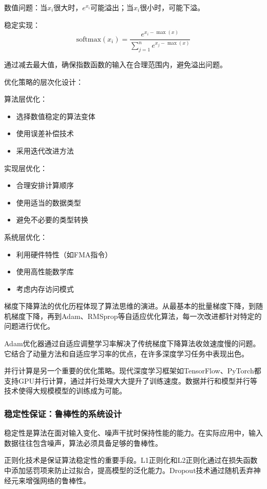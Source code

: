 数值问题：当$x_i$很大时，$e^{x_i}$可能溢出；当$x_i$很小时，可能下溢。

稳定实现：
$$\text{softmax}(x_i) = \frac{e^{x_i - \max(x)}}{\sum_{j=1}^n e^{x_j - \max(x)}}$$

通过减去最大值，确保指数函数的输入在合理范围内，避免溢出问题。

优化策略的层次化设计：

算法层优化：
\begin{itemize}
\item 选择数值稳定的算法变体
\item 使用误差补偿技术
\item 采用迭代改进方法
\end{itemize}

实现层优化：
\begin{itemize}
\item 合理安排计算顺序
\item 使用适当的数据类型
\item 避免不必要的类型转换
\end{itemize}

系统层优化：
\begin{itemize}
\item 利用硬件特性（如FMA指令）
\item 使用高性能数学库
\item 考虑内存访问模式
\end{itemize}

梯度下降算法的优化历程体现了算法思维的演进。从最基本的批量梯度下降，到随机梯度下降，再到Adam、RMSprop等自适应优化算法，每一次改进都针对特定的问题进行优化。

Adam优化器通过自适应调整学习率解决了传统梯度下降算法收敛速度慢的问题。它结合了动量方法和自适应学习率的优点，在许多深度学习任务中表现出色。

并行计算是另一个重要的优化策略。现代深度学习框架如TensorFlow、PyTorch都支持GPU并行计算，通过并行处理大大提升了训练速度。数据并行和模型并行等技术使得大规模模型的训练成为可能。

\subsubsection{稳定性保证：鲁棒性的系统设计}

稳定性是算法在面对输入变化、噪声干扰时保持性能的能力。在实际应用中，输入数据往往包含噪声，算法必须具备足够的鲁棒性。

正则化技术是保证算法稳定性的重要手段。L1正则化和L2正则化通过在损失函数中添加惩罚项来防止过拟合，提高模型的泛化能力。Dropout技术通过随机丢弃神经元来增强网络的鲁棒性。

